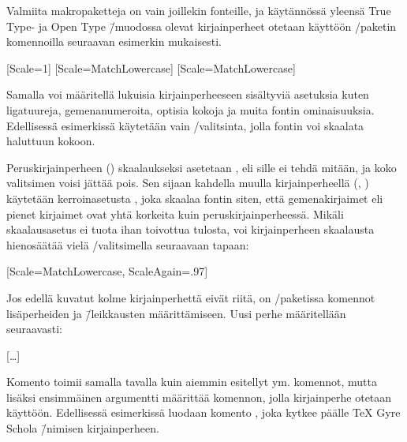 Valmiita makropaketteja on vain joillekin fonteille, ja käytännössä
yleensä True Type- ja Open Type \=/muodossa olevat kirjainperheet
otetaan käyttöön \-/paketin komennoilla seuraavan
esimerkin mukaisesti.

\begin{koodilohkosis}
  \setmainfont{TeX Gyre Termes}[Scale=1]
  \setsansfont{TeX Gyre Heros} [Scale=MatchLowercase]
  \setmonofont{TeX Gyre Cursor}[Scale=MatchLowercase]
\end{koodilohkosis}

Samalla voi määritellä lukuisia kirjainperheeseen sisältyviä asetuksia
kuten ligatuureja, gemenanumeroita, optisia kokoja ja muita fontin
ominaisuuksia. Edellisessä esimerkissä käytetään vain
\-/valitsinta, jolla fontin voi skaalata haluttuun kokoon.

Peruskirjainperheen () skaalaukseksi asetetaan
, eli sille ei tehdä mitään, ja koko valitsimen voisi
jättää pois. Sen sijaan kahdella muulla kirjainperheellä (, ) käytetään
ker\-roin\-ase\-tus\-ta , joka skaalaa fontin
siten, että gemenakirjaimet eli pienet kirjaimet ovat yhtä korkeita kuin
peruskirjainperheessä. Mikäli skaa\-laus\-ase\-tus
 ei tuota ihan toivottua tulosta, voi
kirjainperheen skaalausta hienosäätää vielä
\-/valitsimella seuraavaan tapaan:

\begin{koodilohkosis}
  \setmonofont{TeX Gyre Cursor}
  [Scale=MatchLowercase, ScaleAgain=.97]
\end{koodilohkosis}

\pagebreak[3]

Jos edellä kuvatut kolme kirjainperhettä eivät riitä, on
\-/paketissa komennot lisäperheiden ja \=/leikkausten
määrittämiseen. Uusi perhe määritellään seuraavasti:

\begin{koodilohkosis}
  […]
\end{koodilohkosis}

Komento  toimii samalla tavalla kuin aiemmin
esitellyt  ym. komennot, mutta lisäksi
ensimmäinen argumentti määrittää komennon, jolla kirjainperhe otetaan
käyttöön. Edellisessä esimerkissä luodaan komento , joka kytkee päälle TeX Gyre Scho\-la \=/nimisen
kirjainperheen.

